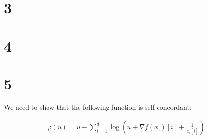 \documentclass{article}
\begin{document}
\section*{3}

\section*{4}

\section*{5}

We need to show that the following function is self-concordant:

\begin{align*}
    \varphi(u) = u - \sum_{i=1}^d \log (u + \nabla f(x_t)[i] + \frac{1}{x_t[i]})
\end{align*}
\end{document}
